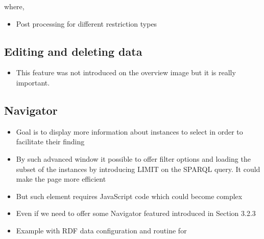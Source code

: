 
where,



\begin{itemize}
	\item Post processing for different restriction types
\end{itemize}



\subsection{Editing and deleting data}

\begin{itemize}
	\item This feature was not introduced on the overview image but it is really important.
\end{itemize}




\subsection{Navigator}


\begin{itemize}
	\item Goal is to display more information about instances to select in order to facilitate their finding
	\item By such advanced window it possible to offer filter options and loading the subset of the instances by introducing LIMIT on the SPARQL query. It could make the page more efficient
	\item But such element requires JavaScript code which could become complex
	\item Even if we need to offer some Navigator featured introduced in Section 3.2.3
\end{itemize}



\begin{itemize}
	\item Example with RDF data configuration and routine for 
\end{itemize}



